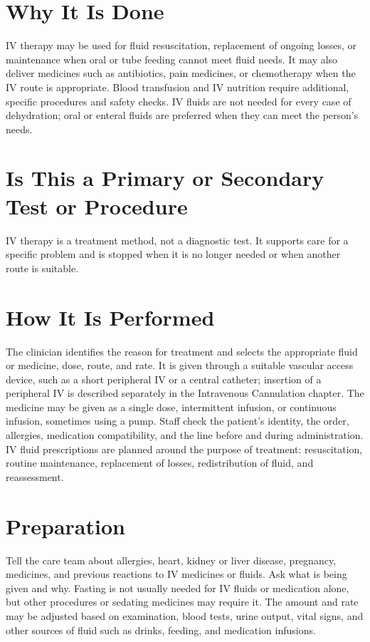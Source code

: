 \section*{Why It Is Done}
IV therapy may be used for fluid resuscitation, replacement of ongoing losses, or maintenance when oral or tube feeding cannot meet fluid needs. It may also deliver medicines such as antibiotics, pain medicines, or chemotherapy when the IV route is appropriate. Blood transfusion and IV nutrition require additional, specific procedures and safety checks. IV fluids are not needed for every case of dehydration; oral or enteral fluids are preferred when they can meet the person's needs.

\section*{Is This a Primary or Secondary Test or Procedure}
IV therapy is a treatment method, not a diagnostic test. It supports care for a specific problem and is stopped when it is no longer needed or when another route is suitable.

\section*{How It Is Performed}
The clinician identifies the reason for treatment and selects the appropriate fluid or medicine, dose, route, and rate. It is given through a suitable vascular access device, such as a short peripheral IV or a central catheter; insertion of a peripheral IV is described separately in the Intravenous Cannulation chapter. The medicine may be given as a single dose, intermittent infusion, or continuous infusion, sometimes using a pump. Staff check the patient's identity, the order, allergies, medication compatibility, and the line before and during administration. IV fluid prescriptions are planned around the purpose of treatment: resuscitation, routine maintenance, replacement of losses, redistribution of fluid, and reassessment.

\section*{Preparation}
Tell the care team about allergies, heart, kidney or liver disease, pregnancy, medicines, and previous reactions to IV medicines or fluids. Ask what is being given and why. Fasting is not usually needed for IV fluids or medication alone, but other procedures or sedating medicines may require it. The amount and rate may be adjusted based on examination, blood tests, urine output, vital signs, and other sources of fluid such as drinks, feeding, and medication infusions.

